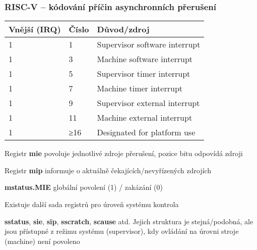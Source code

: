 \documentclass{beamer}
\begin{document}
\begin{frame}
\frametitle{RISC-V -- kódování příčin asynchronních přerušení}

\begin{center}
\small
\begin{tabular}{|l|l|l|}  \hline
Vnější (IRQ) & Číslo & Důvod/zdroj \\\hline
1 & 1 & Supervisor software interrupt \\\hline
1 & 3 & Machine software interrupt \\\hline
1 & 5 & Supervisor timer interrupt \\\hline
1 & 7 & Machine timer interrupt \\\hline
1 & 9 & Supervisor external interrupt \\\hline
1 & 11 & Machine external interrupt \\\hline
1 & ≥16  & Designated for platform use \\\hline
\end{tabular}
\end{center}

\small
Registr \textbf{mie} povoluje jednotlivé zdroje přerušení, pozice bitu odpovídá
zdroji

Registr \textbf{mip} informuje o aktuálně čekajících/nevyřízených zdrojích

\textbf{mstatus.MIE} globální povolení (1) / zakázání (0)

Existuje další sada registrů pro úroveň systému
kontrola

\textbf{sstatus}, \textbf{sie}, \textbf{sip}, \textbf{sscratch}, \textbf{scause} atd. Jejich struktura je
stejná/podobná, ale jsou přístupné z režimu systému (supervisor), kdy ovládání na úrovni stroje (machine) není povoleno
\end{frame}
\end{document}
